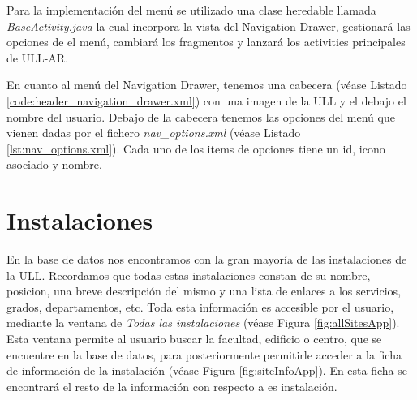 

Para la implementación del menú se utilizado una clase heredable llamada \textit{BaseActivity.java} la cual incorpora la vista del Navigation Drawer, gestionará las opciones de el menú, cambiará los fragmentos y lanzará los activities principales de ULL-AR. 





En cuanto al menú del Navigation Drawer, tenemos una cabecera (véase Listado \ref{code:header_navigation_drawer.xml}) con una imagen de la ULL y el debajo el nombre del usuario. Debajo de la cabecera tenemos las opciones del menú que vienen dadas por el fichero \textit{nav\_options.xml} (véase Listado \ref{lst:nav_options.xml}). Cada uno de los items de opciones tiene un id, icono asociado y nombre.



   


        
\section{Instalaciones}

En la base de datos nos encontramos con la gran mayoría de las instalaciones de la ULL. Recordamos que todas estas instalaciones constan de su nombre, posicion, una breve descripción del mismo y una lista de enlaces a los servicios, grados, departamentos, etc. Toda esta información es accesible por el usuario, mediante la ventana de \textit{Todas las instalaciones} (véase Figura \ref{fig:allSitesApp}). Esta ventana permite al usuario buscar la facultad, edificio o centro, que se encuentre en la base de datos, para posteriormente permitirle acceder a la ficha de información de la instalación (véase Figura \ref{fig:siteInfoApp}). En esta ficha se encontrará el resto de la información con respecto a es instalación.

